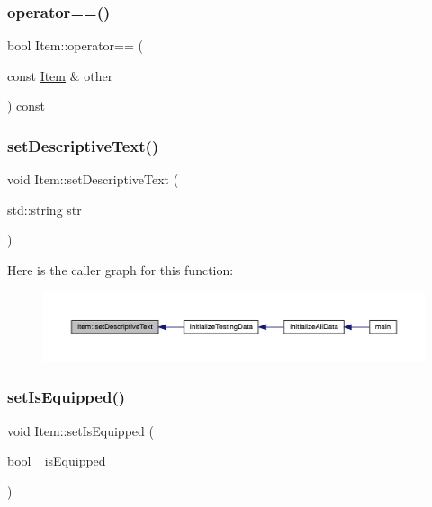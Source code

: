 \mbox{\label{class_item_a754d81f7346aebb775b16969a89021b4}} 
\subsubsection{\texorpdfstring{operator==()}{operator==()}}
{\footnotesize\ttfamily bool Item\+::operator== (\begin{DoxyParamCaption}\item[{const \mbox{\hyperlink{class_item}{Item}} \&}]{other }\end{DoxyParamCaption}) const}

\mbox{\label{class_item_a5eece4e311535630dec1ac8c65b683e6}} 
\subsubsection{\texorpdfstring{set\+Descriptive\+Text()}{setDescriptiveText()}}
{\footnotesize\ttfamily void Item\+::set\+Descriptive\+Text (\begin{DoxyParamCaption}\item[{std\+::string}]{str }\end{DoxyParamCaption})}

Here is the caller graph for this function\+:
\nopagebreak
\begin{figure}[H]
\begin{center}
\leavevmode
\includegraphics[width=350pt]{dc/d32/class_item_a5eece4e311535630dec1ac8c65b683e6_icgraph}
\end{center}
\end{figure}
\mbox{\label{class_item_ade0d63a4f02aa1a97f977b13f96eb891}} 
\subsubsection{\texorpdfstring{set\+Is\+Equipped()}{setIsEquipped()}}
{\footnotesize\ttfamily void Item\+::set\+Is\+Equipped (\begin{DoxyParamCaption}\item[{bool}]{\+\_\+is\+Equipped }\end{DoxyParamCaption})}

